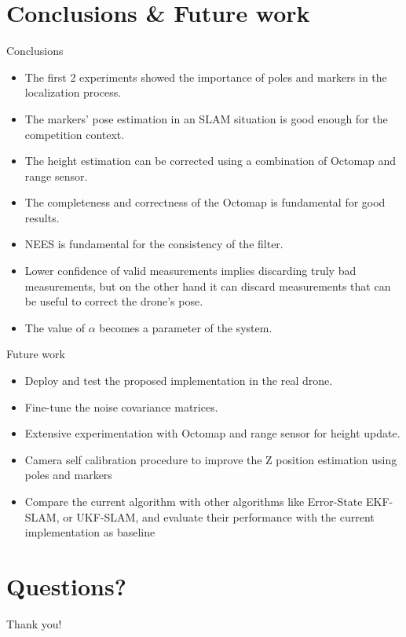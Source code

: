 \documentclass[serif]{beamer}
\begin{document}
    \section{Conclusions \& Future work}

    \begin{frame}[nonumber]{Conclusions}
        \begin{itemize}
            \item{The first 2 experiments showed the importance of poles and markers in the localization process.}
            \item{The markers' pose estimation in an SLAM situation is good enough for the competition context.}
            \item{The height estimation can be corrected using a combination of Octomap and range sensor.}
            \item{The completeness and correctness of the Octomap is fundamental for good results.}
            \item{NEES is fundamental for the consistency of the filter.}
            \item{Lower confidence of valid measurements implies discarding truly bad measurements, but on the other hand it can discard measurements that can be useful to correct the drone's pose.}
            \item{The value of $\alpha$ becomes a parameter of the system.}
        \end{itemize}
    \end{frame}

    \begin{frame}[nonumber]{Future work}
        \begin{itemize}
            \item{Deploy and test the proposed implementation in the real drone.}
            \item{Fine-tune the noise covariance matrices.}
            \item{Extensive experimentation with Octomap and range sensor for height update.}
            \item{Camera self calibration procedure to improve the Z position estimation using poles and markers}
            \item{Compare the current algorithm with other algorithms like Error-State EKF-SLAM, or UKF-SLAM, and evaluate their performance with the current implementation as baseline}
        \end{itemize}
    \end{frame}

    \section*{Questions?}
    \begin{frame}[plain]{}
        \Huge{Thank you!}
        \sectionpage
    \end{frame}
\end{document}
